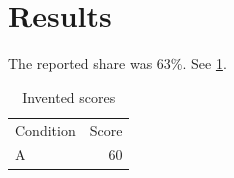 \section{Results}
The reported share was 63\%.
See \ref{tab:unknown}.
\begin{table}\caption{Invented scores}\label{tab:unknown}
\begin{tabular}{lr}Condition & Score \\ A & 60 \\ \end{tabular}
\end{table}
\nocite{*}
